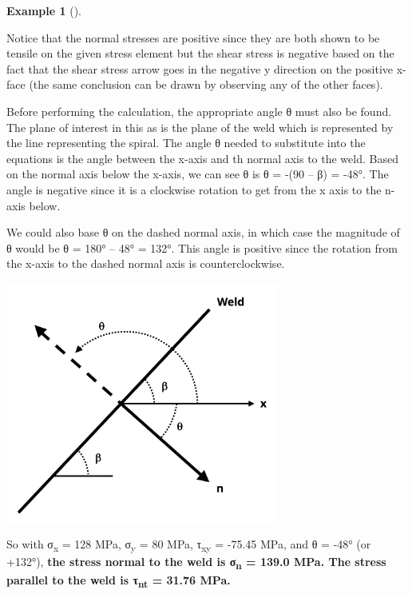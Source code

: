 \documentclass[
  letterpaper,
  DIV=11,
  numbers=noendperiod]{scrreprt}
\theoremstyle{definition}
\newtheorem{example}{Example}[chapter]
\theoremstyle{remark}
\begin{document}
\begin{tcolorbox}
\begin{example}[]
\begin{tcolorbox}
Notice that the normal stresses are positive since they are both shown
to be tensile on the given stress element but the shear stress is
negative based on the fact that the shear stress arrow goes in the
negative y direction on the positive x-face (the same conclusion can be
drawn by observing any of the other faces).

Before performing the calculation, the appropriate angle θ must also be
found. The plane of interest in this as is the plane of the weld which
is represented by the line representing the spiral. The angle θ needed
to substitute into the equations is the angle between the x-axis and th
normal axis to the weld. Based on the normal axis below the x-axis, we
can see θ is θ = -(90 -- β) = -48°. The angle is negative since it is a
clockwise rotation to get from the x axis to the n-axis below.

We could also base θ on the dashed normal axis, in which case the
magnitude of θ would be θ = 180° -- 48° = 132°. This angle is positive
since the rotation from the x-axis to the dashed normal axis is
counterclockwise.

\begin{center}
\includegraphics[width=3.54167in,height=\textheight]{images/CH12 figures/example 12.1 part 2.png}
\end{center}

So with σ\textsubscript{x} = 128 MPa, σ\textsubscript{y} = 80 MPa,
τ\textsubscript{xy} = -75.45 MPa, and θ = -48° (or +132°), \textbf{the
stress normal to the weld is σ\textsubscript{n} = 139.0 MPa. The stress
parallel to the weld is τ\textsubscript{nt} = 31.76 MPa.}

\end{tcolorbox}

\end{example}

\end{tcolorbox}
\end{document}
